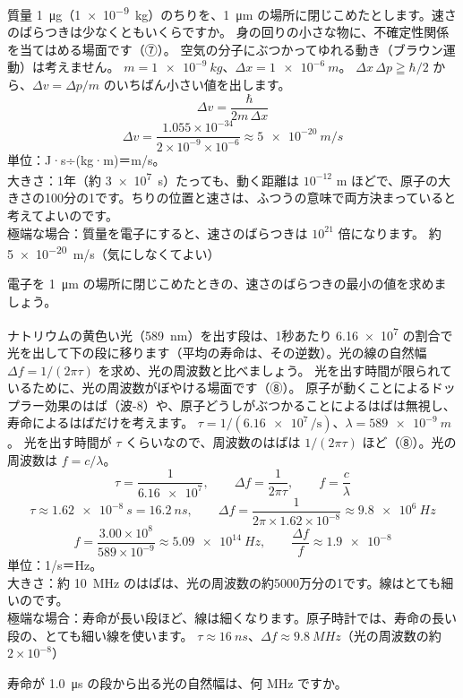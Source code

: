 \label{ph:原-3:ex8}
\begin{phreidai}[ちりの不確定性は気にしなくてよい]
質量 \qty{1}{\micro g}（\qty{1e-9}{kg}）のちりを、\qty{1}{\micro m} の場所に閉じこめたとします。速さのばらつきは少なくともいくらですか。
\phbamen
身の回りの小さな物に、不確定性関係を当てはめる場面です（⑦）。
\phmushi
空気の分子にぶつかってゆれる動き（ブラウン運動）は考えません。
\phzu
$m=\qty{1e-9}{kg}$、$\Delta x=\qty{1e-6}{m}$。
\phriyu
$\Delta x\,\Delta p\geqq\hbar/2$ から、$\Delta v=\Delta p/m$ のいちばん小さい値を出します。
\phtateru
\[ \Delta v=\frac{\hbar}{2m\,\Delta x} \]
\phtoku
\[ \Delta v=\frac{1.055\times10^{-34}}{2\times10^{-9}\times10^{-6}}\approx\qty{5e-20}{m/s} \]
\phtashikame
単位：J·s÷(kg·m)＝m/s。\\
大きさ：1年（約 \qty{3e7}{s}）たっても、動く距離は $10^{-12}$ m ほどで、原子の大きさの100分の1です。ちりの位置と速さは、ふつうの意味で両方決まっていると考えてよいのです。\\
極端な場合：質量を電子にすると、速さのばらつきは $10^{21}$ 倍になります。
\kotae 約\qty{5e-20}{m/s}（気にしなくてよい）
\end{phreidai}
\begin{jibun}
電子を \qty{1}{\micro m} の場所に閉じこめたときの、速さのばらつきの最小の値を求めましょう。
\end{jibun}

\label{ph:原-3:ex9}
\begin{phreidai}[ナトリウムの光の線のはば]
ナトリウムの黄色い光（\qty{589}{nm}）を出す段は、1秒あたり \num{6.16e7} の割合で光を出して下の段に移ります（平均の寿命は、その逆数）。光の線の自然幅 $\Delta f=1/(2\pi\tau)$ を求め、光の周波数と比べましょう。
\phbamen
光を出す時間が限られているために、光の周波数がぼやける場面です（⑧）。
\phmushi
原子が動くことによるドップラー効果のはば（波-8）や、原子どうしがぶつかることによるはばは無視し、寿命によるはばだけを考えます。
\phzu
$\tau=1/(\num{6.16e7}\,\text{/s})$、$\lambda=\qty{589e-9}{m}$。
\phriyu
光を出す時間が $\tau$ くらいなので、周波数のはばは $1/(2\pi\tau)$ ほど（⑧）。光の周波数は $f=c/\lambda$。
\phtateru
\[ \tau=\frac{1}{\num{6.16e7}},\qquad\Delta f=\frac{1}{2\pi\tau},\qquad f=\frac{c}{\lambda} \]
\phtoku
\[ \tau\approx\qty{1.62e-8}{s}=\qty{16.2}{ns},\qquad\Delta f=\frac{1}{2\pi\times1.62\times10^{-8}}\approx\qty{9.8e6}{Hz} \]
\[ f=\frac{3.00\times10^8}{589\times10^{-9}}\approx\qty{5.09e14}{Hz},\qquad\frac{\Delta f}{f}\approx\num{1.9e-8} \]
\phtashikame
単位：1/s＝Hz。\\
大きさ：約 \qty{10}{MHz} のはばは、光の周波数の約5000万分の1です。線はとても細いのです。\\
極端な場合：寿命が長い段ほど、線は細くなります。原子時計では、寿命の長い段の、とても細い線を使います。
\kotae $\tau\approx\qty{16}{ns}$、$\Delta f\approx\qty{9.8}{MHz}$（光の周波数の約 $2\times10^{-8}$）
\end{phreidai}
\begin{jibun}
寿命が \qty{1.0}{\micro s} の段から出る光の自然幅は、何 MHz ですか。
\end{jibun}

